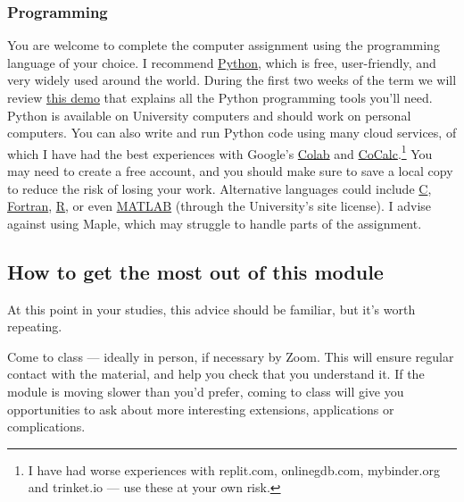 \subsubsection*{Programming}
You are welcome to complete the computer assignment using the programming language of your choice.
I recommend \href{https://www.python.org}{Python}, which is free, user-friendly, and very widely used around the world.
During the first two weeks of the term we will review \href{https://tinyurl.com/math327demo}{this demo} that explains all the Python programming tools you'll need.
Python is available on University computers and should work on personal computers.
You can also write and run Python code using many cloud services, of which I have had the best experiences with Google's \href{https://colab.research.google.com}{Colab} and \href{https://cocalc.com}{CoCalc}.\footnote{I have had worse experiences with replit.com, onlinegdb.com, mybinder.org and trinket.io --- use these at your own risk.} %
You may need to create a free account, and you should make sure to save a local copy to reduce the risk of losing your work.
Alternative languages could include \href{https://en.wikipedia.org/wiki/C_(programming_language)}{C}, \href{https://fortran-lang.org}{Fortran}, \href{https://www.r-project.org}{R}, or even \href{https://matlab.mathworks.com}{MATLAB} (through the University's site license).
I advise against using Maple, which may struggle to handle parts of the assignment.



\subsection*{How to get the most out of this module}
At this point in your studies, this advice should be familiar, but it's worth repeating.

Come to class --- ideally in person, if necessary by Zoom.
This will ensure regular contact with the material, and help you check that you understand it.
If the module is moving slower than you'd prefer, coming to class will give you opportunities to ask about more interesting extensions, applications or complications.

